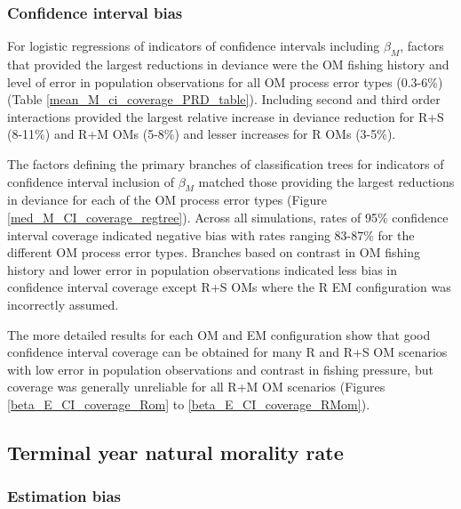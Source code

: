 \documentclass[
  12pt,
]{article}
\begin{document}
\subsubsection*{Confidence interval bias}\label{confidence-interval-bias-1}

For logistic regressions of indicators of confidence intervals including \(\beta_M\), factors that provided the largest reductions in deviance were the OM fishing history and level of error in population observations for all OM process error types (0.3-6\%) (Table \ref{mean_M_ci_coverage_PRD_table}). Including second and third order interactions provided the largest relative increase in deviance reduction for R+S (8-11\%) and R+M OMs (5-8\%) and lesser increases for R OMs (3-5\%).

The factors defining the primary branches of classification trees for indicators of confidence interval inclusion of \(\beta_M\) matched those providing the largest reductions in deviance for each of the OM process error types (Figure \ref{med_M_CI_coverage_regtree}). Across all simulations, rates of 95\% confidence interval coverage indicated negative bias with rates ranging 83-87\% for the different OM process error types. Branches based on contrast in OM fishing history and lower error in population observations indicated less bias in confidence interval coverage except R+S OMs where the R EM configuration was incorrectly assumed.

The more detailed results for each OM and EM configuration show that good confidence interval coverage can be obtained for many R and R+S OM scenarios with low error in population observations and contrast in fishing pressure, but coverage was generally unreliable for all R+M OM scenarios (Figures \ref{beta_E_CI_coverage_Rom} to \ref{beta_E_CI_coverage_RMom}).

\subsection*{Terminal year natural morality rate}\label{terminal-year-natural-morality-rate}

\subsubsection*{Estimation bias}\label{estimation-bias-2}
\end{document}
